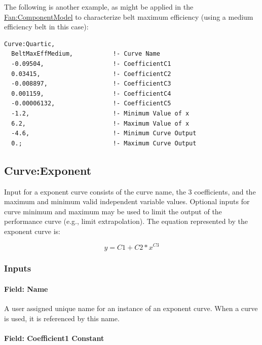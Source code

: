 The following is another example, as might be applied in the \hyperref[fancomponentmodel]{Fan:ComponentModel} to characterize belt maximum efficiency (using a medium efficiency belt in this case):

\begin{lstlisting}
Curve:Quartic,
  BeltMaxEffMedium,           !- Curve Name
  -0.09504,                   !- CoefficientC1
  0.03415,                    !- CoefficientC2
  -0.008897,                  !- CoefficientC3
  0.001159,                   !- CoefficientC4
  -0.00006132,                !- CoefficientC5
  -1.2,                       !- Minimum Value of x
  6.2,                        !- Maximum Value of x
  -4.6,                       !- Minimum Curve Output
  0.;                         !- Maximum Curve Output
\end{lstlisting}

\subsection{Curve:Exponent}\label{curveexponent}

Input for a exponent curve consists of the curve name, the 3 coefficients, and the maximum and minimum valid independent variable values. Optional inputs for curve minimum and maximum may be used to limit the output of the performance curve (e.g., limit extrapolation). The equation represented by the exponent curve is:

\begin{equation}
y = C1 + C2*{x^{C3}}
\end{equation}

\subsubsection{Inputs}\label{inputs-5-019}

\paragraph{Field: Name}\label{field-name-5-015}

A user assigned unique name for an instance of an exponent curve. When a curve is used, it is referenced by this name.

\paragraph{Field: Coefficient1 Constant}\label{field-coefficient1-constant-5}

